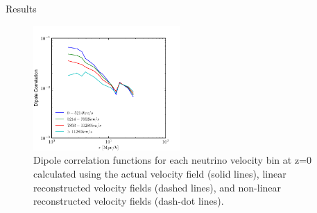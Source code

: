 \begin{section}{Results}
\begin{figure}[htbp]
  \begin{center}
    \includegraphics[width=0.5\textwidth]{./figures/Dipole/dipolefig.pdf}
    \caption{Dipole correlation functions for each neutrino
	      velocity bin at z=0 calculated using the actual velocity 
	      field (solid lines), linear reconstructed velocity fields 
	      (dashed lines), and non-linear reconstructed velocity fields 
	      (dash-dot lines).}
    \label{fig:reldipolefig}
  \end{center}
\end{figure}

\end{section}
